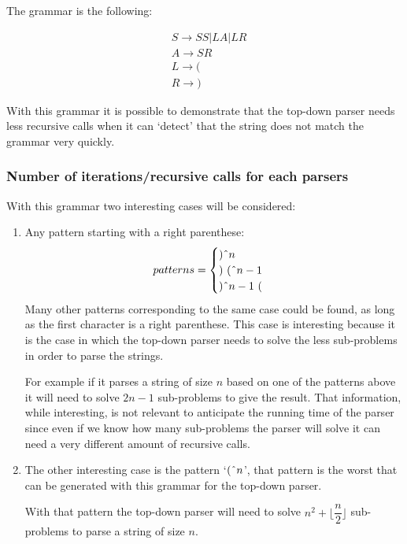 The grammar is the following:

\begin{align*} 
    &S \to SS|LA|LR\\
    &A \to SR\\
    &L \to (\\
    &R \to )
\end{align*}

With this grammar it is possible to demonstrate that the top-down parser needs less recursive calls when it can `detect' that the string does not match the grammar very quickly.

\subsubsection{Number of iterations/recursive calls for each parsers}

With this grammar two interesting cases will be considered:

\begin{enumerate}
    \item Any pattern starting with a right parenthese:
    $$
    patterns = 
    \begin{cases}
        )\string^ n\\
        ) \text{ } (\string^ n - 1\\
        )\string^ n - 1 \text{ } (\\
    \end{cases}
    $$
    Many other patterns corresponding to the same case could be found, as long as the first character is a right parenthese.
    This case is interesting because it is the case in which the top-down parser needs to solve the less sub-problems in order to parse the strings.
    
    For example if it parses a string of size $n$ based on one of the patterns above it will need to solve $2n - 1$ sub-problems to give the result.
    That information, while interesting, is not relevant to anticipate the running time of the parser since even if we know how many sub-problems the parser will solve it can need a very different amount of recursive calls.
    
    \item The other interesting case is the pattern `$(\string^ n$', that pattern is the worst that can be generated with this grammar for the top-down parser.

    With that pattern the top-down parser will need to solve $n^2 + \lfloor \dfrac{n}{2} \rfloor$ sub-problems to parse a string of size $n$.
\end{enumerate}

